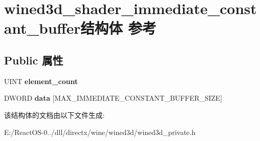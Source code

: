 \hypertarget{structwined3d__shader__immediate__constant__buffer}{}\section{wined3d\+\_\+shader\+\_\+immediate\+\_\+constant\+\_\+buffer结构体 参考}
\label{structwined3d__shader__immediate__constant__buffer}
\subsection*{Public 属性}
\begin{DoxyCompactItemize}
\item 
\mbox{\label{structwined3d__shader__immediate__constant__buffer_a85c4ceae1042277e23f030f815ef348b}} 
U\+I\+NT {\bfseries element\+\_\+count}
\item 
\mbox{\label{structwined3d__shader__immediate__constant__buffer_a650a075603fa28f59438289c1ed6f36e}} 
D\+W\+O\+RD {\bfseries data} \mbox{[}M\+A\+X\+\_\+\+I\+M\+M\+E\+D\+I\+A\+T\+E\+\_\+\+C\+O\+N\+S\+T\+A\+N\+T\+\_\+\+B\+U\+F\+F\+E\+R\+\_\+\+S\+I\+ZE\mbox{]}
\end{DoxyCompactItemize}


该结构体的文档由以下文件生成\+:\begin{DoxyCompactItemize}
\item 
E\+:/\+React\+O\+S-\/0../dll/directx/wine/wined3d/wined3d\+\_\+private.\+h\end{DoxyCompactItemize}
